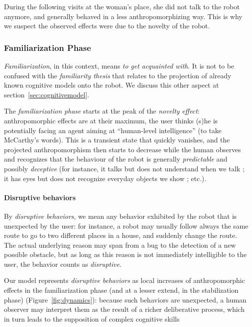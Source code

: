 \documentclass{frontiersSCNS} %
\begin{document}
During the following visits at the woman's place, she did not talk to the robot
anymore, and generally behaved in a less anthropomorphizing way. This is why we
suspect the observed effects were due to the novelty of the robot.

\subsubsection{Familiarization Phase}
\label{sec:familiarization}

\emph{Familiarization}, in this context, means \emph{to get acquainted with}.
It is not to be confused with the \emph{familiarity thesis} that relates to the
projection of already known cognitive models onto the robot. We discuss this other
aspect at section~\ref{sec:cognitivemodel}.

The \emph{familiarization phase} starts at the peak of the \emph{novelty
effect}: anthropomorphic effects are at their maximum, the user thinks (s)he is
potentially facing an agent aiming at ``human-level intelligence'' (to take
McCarthy's words). This is a transient state that quickly vanishes, and the
projected anthropomorphism then starts to decrease while the human observes and
recognizes that the behaviour of the robot is generally \emph{predictable} and
possibly \emph{deceptive} (for instance, it talks but does not understand when
we talk ; it has eyes but does not recognize everyday objects we show ; etc.).

\paragraph{Disruptive behaviors}

By \emph{disruptive behaviors}, we mean any behavior exhibited by the robot
that is unexpected by the user: for instance, a robot may usually follow always
the same route to go to two different places in a house, and suddenly change
the route. The actual underlying reason may span from a bug to the detection of
a new possible obstacle, but as long as this reason is not immediately
intelligible to the user, the behavior counts as \emph{disruptive}.

Our model represents \emph{disruptive behaviors} as local increases of
anthropomorphic effects in the familiarization phase (and at a lesser extend,
in the stabilization phase) (Figure~\ref{fig:dynamics}): because such behaviors
are unexpected, a human observer may interpret them as the result of a richer
deliberative process, which in turn leads to the supposition of complex
cognitive skills
\end{document}
